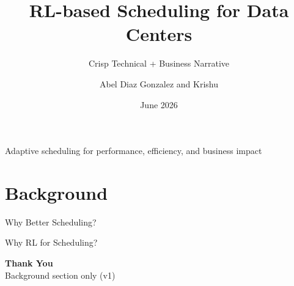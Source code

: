 \documentclass[aspectratio=169]{beamer}
\title[RL Scheduling for DCs]{RL-based Scheduling for Data Centers}
\subtitle{Crisp Technical + Business Narrative}
\author[A. Diaz Gonzalez \& K. Team]{Abel Diaz Gonzalez and Krishu}
\institute[Lab / BU]{Lab / BU Collaboration}
\date{June 2026}
\begin{document}
\begin{frame}
  \titlepage
  \vspace{-0.5em}
  \begin{center}
    \small\color{DeepBlue}Adaptive scheduling for performance, efficiency, and business impact
  \end{center}
\end{frame}

\section{Background}

\begin{frame}{Why Better Scheduling?}
  \centering
  
\end{frame}

\begin{frame}{Why RL for Scheduling?}
  \centering
  
\end{frame}

\begin{frame}
  \centering
  \Huge\textbf{Thank You}\\[0.8em]
  \large Background section only (v1)
\end{frame}
\end{document}
